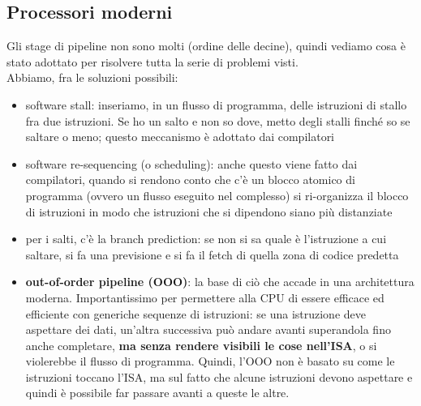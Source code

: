 \documentclass[14pt, oneside]{book}
\begin{document}
\subsection{Processori moderni}
Gli stage di pipeline non sono molti (ordine delle decine), quindi vediamo cosa è stato adottato per risolvere tutta la serie di problemi visti.\\ Abbiamo, fra le soluzioni possibili:
\begin{itemize}
\item software stall: inseriamo, in un flusso di programma, delle istruzioni di stallo fra due istruzioni. Se ho un salto e non so dove, metto degli stalli finché so se saltare o meno; questo meccanismo è adottato dai compilatori
\item software re-sequencing (o scheduling): anche questo viene fatto dai compilatori, quando si rendono conto che c'è un blocco atomico di programma (ovvero un flusso eseguito nel complesso) si ri-organizza il blocco di istruzioni in modo che istruzioni che si dipendono siano più distanziate
\item per i salti, c'è la branch prediction: se non si sa quale è l'istruzione a cui saltare, si fa una previsione e si fa il fetch di quella zona di codice predetta
\item \textbf{out-of-order pipeline (OOO)}: la base di ciò che accade in una architettura moderna. Importantissimo per permettere alla CPU di essere efficace ed efficiente con generiche sequenze di istruzioni: se una istruzione deve aspettare dei dati, un'altra successiva può andare avanti superandola fino anche completare, \textbf{ma senza rendere visibili le cose nell'ISA}, o si violerebbe il flusso di programma. Quindi, l'OOO non è basato su come le istruzioni toccano l'ISA, ma sul fatto che alcune istruzioni devono aspettare e quindi è possibile far passare avanti a queste le altre.
\end{itemize}
\end{document}

